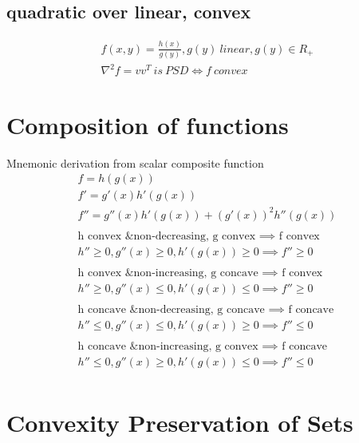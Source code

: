 \message{ !name(notebook.tex)}\documentclass[8pt]{report}
\begin{document}
\begin{multicols*}{2}
  \subsection{quadratic over linear, convex}
  \begin{align*}
    f(x,y) = \frac{h(x)}{g(y)}, g(y) \ linear, g(y) \in R_+\\
    \nabla^2 f = vv^T \ is\ PSD \iff f\ convex
  \end{align*}

  \vfill\null
  \columnbreak
  
  \section{Composition of functions}

  Mnemonic derivation from scalar composite function
  \begin{align*}
    f=h(g(x))\\
    f'=g'(x)h'(g(x))\\
    f''=g''(x)h'(g(x)) + (g'(x))^2 h''(g(x))\\
    \\
    \text{h convex \& non-decreasing, g convex } \implies \text{ f convex}\\
    h'' \geq 0, g''(x) \geq 0, h'(g(x)) \geq 0 \implies f'' \geq 0\\
    \\
    \text{h convex \& non-increasing, g concave } \implies \text{ f convex}\\
    h'' \geq 0, g''(x) \leq 0, h'(g(x)) \leq 0 \implies f'' \geq 0\\
    \\
    \text{h concave \& non-decreasing, g concave } \implies \text{ f concave}\\
    h'' \leq 0, g''(x) \leq 0, h'(g(x)) \geq 0 \implies f'' \leq 0\\
    \\
    \text{h concave \& non-increasing, g convex } \implies \text{ f concave}\\
    h'' \leq 0, g''(x) \geq 0, h'(g(x)) \leq 0 \implies f'' \leq 0\\
  \end{align*}

  \vfill\null
  
  \pagebreak
  
  \section{Convexity Preservation of Sets}

\end{multicols*}
\end{document}
